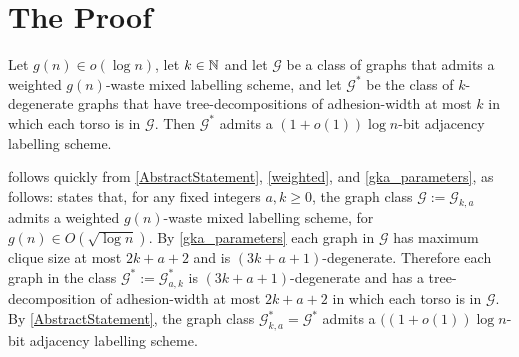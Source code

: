 \documentclass{patmorin}
\renewcommand{\ge}{\geqslant}
\newcommand{\pat}[1]{\textcolor{Blue}{PaMo: #1}}
\begin{document}

  \section{The Proof}


  \begin{thm}\label{AbstractStatement}
    Let $g(n)\in o(\log n)$, let $k\in\mathbb{N}$ and
    let $\mathcal{G}$ be a class of graphs that admits a weighted $g(n)$-waste mixed labelling scheme, and let $\mathcal{G}^*$ be the class of $k$-degenerate graphs that have tree-decompositions of adhesion-width at most $k$ in which each torso is in $\mathcal{G}$.  Then $\mathcal{G}^*$ admits a $(1+o(1))\log n$-bit adjacency labelling scheme.
  \end{thm}

   follows quickly from \cref{AbstractStatement}, \cref{weighted}, and \cref{gka_parameters}, as follows:   states that, for any fixed integers $a,k\ge 0$, the graph class $\mathcal{G}:=\mathcal{G}_{k,a}$ admits a weighted $g(n)$-waste mixed labelling scheme, for $g(n)\in O(\sqrt{\log n})$.  By \cref{gka_parameters} each graph in $\mathcal{G}$ has maximum clique size at most $2k+a+2$ and is $(3k+a+1)$-degenerate.  Therefore each graph in the class $\mathcal{G}^*:=\mathcal{G}^*_{a,k}$ is $(3k+a+1)$-degenerate and has a tree-decomposition of adhesion-width at most $2k+a+2$ in which each torso is in $\mathcal{G}$.  By \cref{AbstractStatement}, the graph class $\mathcal{G}^*_{k,a}=\mathcal{G}^*$ admits a $((1+o(1))\log n$-bit adjacency labelling scheme.
\end{document}
